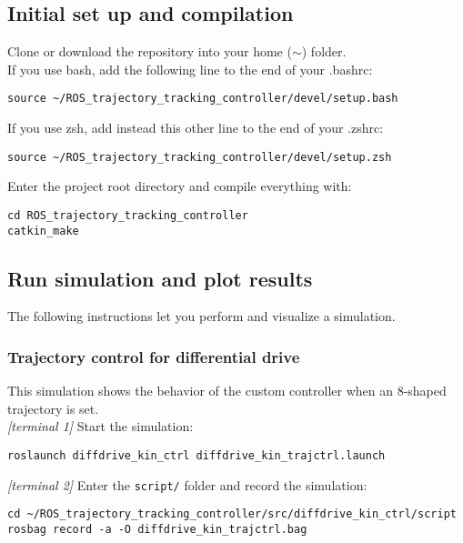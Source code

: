 \documentclass[11pt,a4paper]{article}
\begin{document}
\subsection{Initial set up and compilation}

Clone or download the repository into your home ($\sim$) folder.\\

If you use bash, add the following line to the end of your .bashrc:
\begin{lstlisting}
source ~/ROS_trajectory_tracking_controller/devel/setup.bash
\end{lstlisting}

If you use zsh, add instead this other line to the end of your .zshrc:
\begin{lstlisting}
source ~/ROS_trajectory_tracking_controller/devel/setup.zsh
\end{lstlisting}

Enter the project root directory and compile everything with:
\begin{lstlisting}
cd ROS_trajectory_tracking_controller
catkin_make
\end{lstlisting}

\subsection{Run simulation and plot results}

The following instructions let you perform and visualize a simulation.

\subsubsection{Trajectory control for differential drive}

This simulation shows the behavior of the custom controller when an 8-shaped trajectory is set.\\

\textit{[terminal 1]} Start the simulation:
\begin{lstlisting}
roslaunch diffdrive_kin_ctrl diffdrive_kin_trajctrl.launch
\end{lstlisting}


\textit{[terminal 2]} Enter the \texttt{script/} folder and record the simulation:
\begin{lstlisting}
cd ~/ROS_trajectory_tracking_controller/src/diffdrive_kin_ctrl/script
rosbag record -a -O diffdrive_kin_trajctrl.bag
\end{lstlisting}
\end{document}
